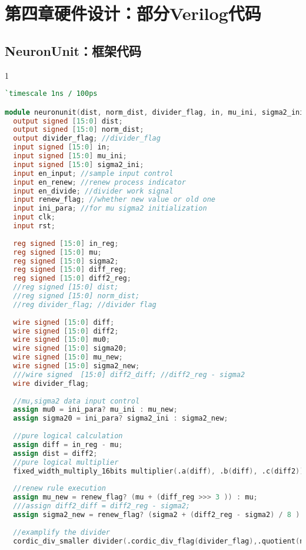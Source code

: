 \section{第四章硬件设计：部分Verilog代码}
\subsection{NeuronUnit：框架代码}
\begin{spacing}{1}
\begin{lstlisting}[language=Verilog]
`timescale 1ns / 100ps

module neuronunit(dist, norm_dist, divider_flag, in, mu_ini, sigma2_ini, en_input, en_renew, en_divide, renew_flag, ini_para, clk, rst);
  output signed [15:0] dist;
  output signed [15:0] norm_dist;
  output divider_flag; //divider_flag
  input signed [15:0] in;
  input signed [15:0] mu_ini;
  input signed [15:0] sigma2_ini;
  input en_input; //sample input control
  input en_renew; //renew process indicator
  input en_divide; //divider work signal
  input renew_flag; //whether new value or old one
  input ini_para; //for mu sigma2 initialization
  input clk;
  input rst;
  
  reg signed [15:0] in_reg;
  reg signed [15:0] mu;
  reg signed [15:0] sigma2;
  reg signed [15:0] diff_reg;
  reg signed [15:0] diff2_reg;
  //reg signed [15:0] dist;
  //reg signed [15:0] norm_dist;
  //reg divider_flag; //divider flag
  
  wire signed [15:0] diff;
  wire signed [15:0] diff2;
  wire signed [15:0] mu0;
  wire signed [15:0] sigma20;
  wire signed [15:0] mu_new;
  wire signed [15:0] sigma2_new;
  ///wire signed  [15:0] diff2_diff; //diff2_reg - sigma2
  wire divider_flag;
  
  //mu,sigma2 data input control
  assign mu0 = ini_para? mu_ini : mu_new;
  assign sigma20 = ini_para? sigma2_ini : sigma2_new;
  
  //pure logical calculation
  assign diff = in_reg - mu;
  assign dist = diff2;
  //pure logical multiplier
  fixed_width_multiply_16bits multiplier(.a(diff), .b(diff), .c(diff2));
  
  //renew rule execution
  assign mu_new = renew_flag? (mu + (diff_reg >>> 3 )) : mu;
  ///assign diff2_diff = diff2_reg - sigma2;
  assign sigma2_new = renew_flag? (sigma2 + (diff2_reg - sigma2) / 8 ) : sigma2;
  
  //examplify the divider
  cordic_div_smaller divider(.cordic_div_flag(divider_flag),.quotient(norm_dist),.dividend(diff2_reg),.division(sigma2),.clk(clk),.rst(rst),.cordic_div_en(en_divide));
  

\end{lstlisting}
\end{spacing}
